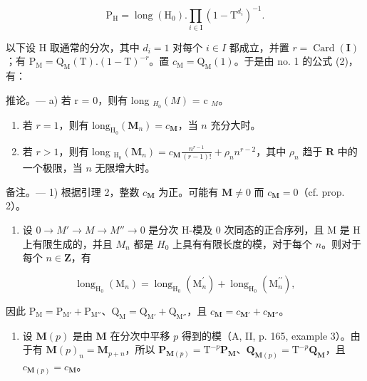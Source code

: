 \[
\mathrm{P} _ {\mathrm{H}} = \operatorname{long} (\mathrm{H} _ {0}). \prod_ {i \in \mathrm{I}} (1 - \mathrm{T} ^ {d _ {i}}) ^ {- 1}.\tag{6}
\]

以下设 H 取通常的分次，其中 \(d_{i}=1\) 对每个 \(i\in I\) 都成立，并置 \(r=\operatorname{Card}(\mathbf{I})\)；有 \(\mathrm{P}_{\mathrm{M}}=\mathrm{Q}_{\mathrm{M}}(\mathrm{T}).(1-\mathrm{T})^{-r}\)。置 \(c_{\mathrm{M}}=\mathrm{Q}_{\mathrm{M}}(1)\)。于是由 no. 1 的公式 (2)，有：

推论。--- a) 若 r = 0，则有 long \(_{H_{0}}(M)\) = c \(_{M}\)。

\begin{enumerate}
\def\labelenumi{\alph{enumi})}
\setcounter{enumi}{1}
\item
  若 \(r = 1\)，则有 \(\mathrm{long}_{\mathrm{H}_0}(\mathbf{M}_n) = c_{\mathbf{M}}\)，当 \(n\) 充分大时。
\item
  若 \(r > 1\)，则有 long \(_{\mathrm{H}_0}(\mathbf{M}_n) = c_{\mathbf{M}} \frac{n^{r-1}}{(r - 1)!} + \rho_n n^{r-2}\)，其中 \(\rho_n\) 趋于 \(\mathbf{R}\) 中的一个极限，当 \(n\) 无限增大时。
\end{enumerate}

备注。--- 1) 根据引理 2，整数 \(c_{\mathbf{M}}\) 为正。可能有 \(\mathbf{M} \neq 0\) 而 \(c_{\mathbf{M}} = 0\)（cf. prop. 2）。

\begin{enumerate}
\def\labelenumi{\arabic{enumi})}
\setcounter{enumi}{1}
\tightlist
\item
  设 \(0 \to M' \to M \to M'' \to 0\) 是分次 H-模及 0 次同态的正合序列，且 M 是 H 上有限生成的，并且 \(M_n\) 都是 \(H_0\) 上具有有限长度的模，对于每个 \(n\)。则对于每个 \(n \in \mathbf{Z}\)，有
\end{enumerate}

\[
\operatorname{long} _ {\mathrm{H} _ {0}} \left(\mathrm{M} _ {n}\right) = \operatorname{long} _ {\mathrm{H} _ {0}} \left(\mathrm{M} _ {n} ^ {\prime}\right) + \operatorname{long} _ {\mathrm{H} _ {0}} \left(\mathrm{M} _ {n} ^ {\prime \prime}\right),
\]

因此 \(\mathrm{P_M} = \mathrm{P_{M'}} + \mathrm{P_{M''}}\)、\(\mathrm{Q_M} = \mathrm{Q_{M'}} + \mathrm{Q_{M''}}\)，且 \(c_{\mathbf{M}} = c_{\mathbf{M'}} + c_{\mathbf{M''}}\)。

\begin{enumerate}
\def\labelenumi{\arabic{enumi})}
\setcounter{enumi}{2}
\tightlist
\item
  设 \(\mathbf{M}(p)\) 是由 \(\mathbf{M}\) 在分次中平移 \(p\) 得到的模（A, II, p. 165, example 3）。由于有 \(\mathbf{M}(p)_n = \mathbf{M}_{p+n}\)，所以 \(\mathbf{P}_{\mathbf{M}(p)} = \mathrm{T}^{-p}\mathbf{P}_{\mathbf{M}}\)、\(\mathbf{Q}_{\mathbf{M}(p)} = \mathrm{T}^{-p}\mathbf{Q}_{\mathbf{M}}\)，且 \(c_{\mathbf{M}(p)} = c_{\mathbf{M}}\)。
\end{enumerate}


